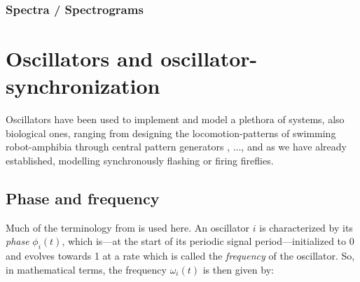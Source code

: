 		\subsubsection{Spectra / Spectrograms}




\section{Oscillators and oscillator-synchronization}





	 \nl



Oscillators have been used to implement and model a plethora of systems, also biological ones, ranging from designing the locomotion-patterns of swimming robot-amphibia through central pattern generators \cite{ijspeert_cpg}, ..., and as we have already established, modelling synchronously flashing or firing fireflies.
	
	
	\subsection{Phase and frequency}
	Much of the terminology from \cite{nymoen_synch} is used here. An oscillator $i$ is characterized by its \textit{phase} $\phi_i(t)$, which is—at the start of its periodic signal period—initialized to 0 and evolves towards 1 at a rate which is called the \textit{frequency} of the oscillator. So, in mathematical terms, the frequency $\omega_i(t)$ is then given by:
	
